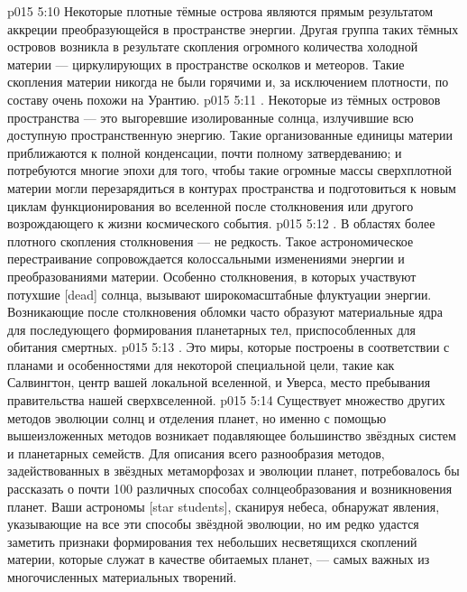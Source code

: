 \vs p015 5:10 Некоторые плотные тёмные острова являются прямым результатом аккреции преобразующейся в пространстве энергии. Другая группа таких тёмных островов возникла в результате скопления огромного количества холодной материи --- циркулирующих в пространстве осколков и метеоров. Такие скопления материи никогда не были горячими и, за исключением плотности, по составу очень похожи на Урантию.
\vs p015 5:11 . Некоторые из тёмных островов пространства --- это выгоревшие изолированные солнца, излучившие всю доступную пространственную энергию. Такие организованные единицы материи приближаются к полной конденсации, почти полному затвердеванию; и потребуются многие эпохи для того, чтобы такие огромные массы сверхплотной материи могли перезарядиться в контурах пространства и подготовиться к новым циклам функционирования во вселенной после столкновения или другого возрождающего к жизни космического события.
\vs p015 5:12 . В областях более плотного скопления столкновения --- не редкость. Такое астрономическое перестраивание сопровождается колоссальными изменениями энергии и преобразованиями материи. Особенно столкновения, в которых участвуют потухшие [dead] солнца, вызывают широкомасштабные флуктуации энергии. Возникающие после столкновения обломки часто образуют материальные ядра для последующего формирования планетарных тел, приспособленных для обитания смертных.
\vs p015 5:13 . Это миры, которые построены в соответствии с планами и особенностями для некоторой специальной цели, такие как Салвингтон, центр вашей локальной вселенной, и Уверса, место пребывания правительства нашей сверхвселенной.
\vs p015 5:14 \pc Существует множество других методов эволюции солнц и отделения планет, но именно с помощью вышеизложенных методов возникает подавляющее большинство звёздных систем и планетарных семейств. Для описания всего разнообразия методов, задействованных в звёздных метаморфозах и эволюции планет, потребовалось бы рассказать о почти 100 различных способах солнцеобразования и возникновения планет. Ваши астрономы [star students], сканируя небеса, обнаружат явления, указывающие на все эти способы звёздной эволюции, но им редко удастся заметить признаки формирования тех небольших несветящихся скоплений материи, которые служат в качестве обитаемых планет, --- самых важных из многочисленных материальных творений.
